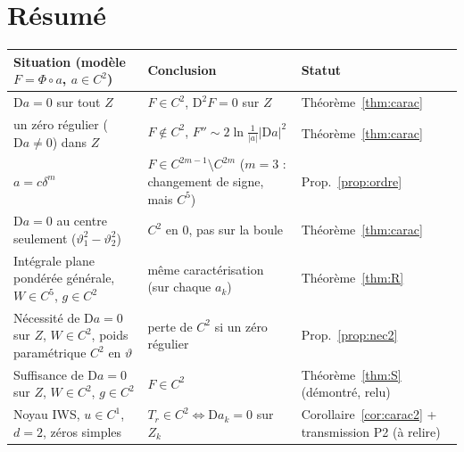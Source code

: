\documentclass[11pt,a4paper]{article}
\theoremstyle{remark}
\newcommand{\vth}{\vartheta}
\newcommand{\D}{\mathrm D}
\begin{document}
\section{Résumé}
\begin{center}\small
\begin{tabular}{p{5.2cm}p{5.6cm}p{3.6cm}}
\toprule
Situation (modèle $F=\Phi\circ a$, $a\in C^2$) & Conclusion & Statut\\\midrule
$\D a=0$ sur tout $Z$ & $F\in C^2$, $\D^2F=0$ sur $Z$ & Théorème~\ref{thm:carac}\\
un zéro régulier ($\D a\ne0$) dans $Z$ & $F\notin C^2$, $F''\sim2\ln\frac1{\lvert a\rvert}\lvert\D a\rvert^2$ & Théorème~\ref{thm:carac}\\
$a=c\delta^m$ & $F\in C^{2m-1}\setminus C^{2m}$ ($m=3$ : changement de signe, mais $C^5$) & Prop.~\ref{prop:ordre}\\
$\D a=0$ au centre seulement ($\vth_1^2-\vth_2^2$) & $C^2$ en $0$, pas sur la boule & Théorème~\ref{thm:carac}\\
Intégrale plane pondérée générale, $W\in C^5$, $g\in C^2$ & même caractérisation (sur chaque $a_k$) & Théorème~\ref{thm:R}\\
Nécessité de $\D a=0$ sur $Z$, $W\in C^2$, poids paramétrique $C^2$ en $\vth$ & perte de $C^2$ si un zéro régulier & Prop.~\ref{prop:nec2}\\
Suffisance de $\D a=0$ sur $Z$, $W\in C^2$, $g\in C^2$ & $F\in C^2$ & Théorème~\ref{thm:S} (démontré, relu)\\
Noyau IWS, $u\in C^1$, $d=2$, zéros simples & $T_r\in C^2\iff\D a_k=0$ sur $Z_k$ & Corollaire~\ref{cor:carac2} + transmission P2 (à relire)\\
\bottomrule
\end{tabular}
\end{center}
\end{document}
